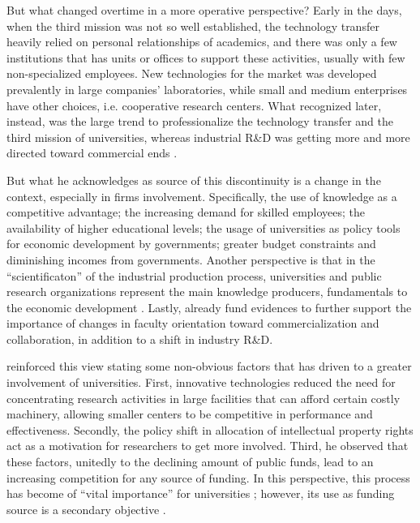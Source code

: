 But what changed overtime in a more operative perspective? Early in the days, when the third mission was not so well established, the technology transfer heavily relied on personal relationships of academics, and there was only a few institutions that has units or offices to support these activities, usually with few non-specialized employees. New technologies for the market was developed prevalently in large companies' laboratories, while small and medium enterprises have other choices, i.e. cooperative research centers. What \citet{Geuna2009} recognized later, instead, was the large trend to professionalize the technology transfer and the third mission of universities, whereas industrial R\&D was getting more and more directed toward commercial ends \citep{Fritsch2007}.

But what he acknowledges as source of this discontinuity is a change in the context, especially in firms involvement. Specifically, the use of knowledge as a competitive advantage; the increasing demand for skilled employees; the availability of higher educational levels; the usage of universities as policy tools for economic development by governments; greater budget constraints and diminishing incomes from governments. Another perspective is that in the \enquote{scientificaton} of the industrial production process, universities and public research organizations represent the main knowledge producers, fundamentals to the economic development \citep{Balderi2007}. Lastly, already \citet{Thursby2002} fund evidences to further support the importance of changes in faculty orientation toward commercialization and collaboration, in addition to a shift in industry R\&D.

\citet{Baldini2007} reinforced this view stating some non-obvious factors that has driven to a greater involvement of universities. First, innovative technologies reduced the need for concentrating research activities in large facilities that can afford certain costly machinery, allowing smaller centers to be competitive in performance and effectiveness. Secondly, the policy shift in allocation of intellectual property rights act as a motivation for researchers to get more involved. Third, he observed that these factors, unitedly to the declining amount of public funds, lead to an increasing competition for any source of funding. In this perspective, this process has become of \enquote{vital importance} for universities \citep{Muscio2008}; however, its use as funding source is a secondary objective \citep{Jensen1998}.

